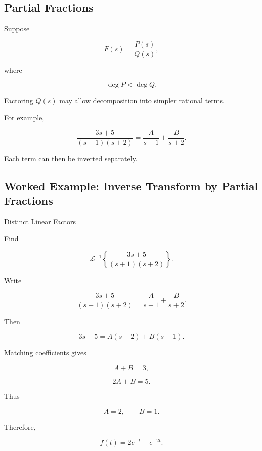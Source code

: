 \subsection{Partial Fractions}
\label{subsec:laplace-partial-fractions}

Suppose

\[
F(s)
=
\frac{
P(s)
}{
Q(s)
},
\]

where

\[
\deg P<\deg Q.
\]

Factoring \(Q(s)\) may allow decomposition into simpler rational terms.

For example,

\[
\boxed{
\frac{
3s+5
}{
(s+1)(s+2)
}
=
\frac{A}{s+1}
+
\frac{B}{s+2}.
}
\]

Each term can then be inverted separately.

\subsection{Worked Example: Inverse Transform by Partial Fractions}
\label{subsec:worked-inverse-partial-fractions}

\begin{workedexamplebox}{Distinct Linear Factors}

Find

\[
\mathcal{L}^{-1}
\left\{
\frac{
3s+5
}{
(s+1)(s+2)
}
\right\}.
\]

Write

\[
\frac{
3s+5
}{
(s+1)(s+2)
}
=
\frac{A}{s+1}
+
\frac{B}{s+2}.
\]

Then

\[
3s+5
=
A(s+2)
+
B(s+1).
\]

Matching coefficients gives

\[
A+B=3,
\]

\[
2A+B=5.
\]

Thus

\[
A=2,
\qquad
B=1.
\]

Therefore,

\begin{answerbox}
\[
\boxed{
f(t)
=
2e^{-t}
+
e^{-2t}.
}
\]
\end{answerbox}

\end{workedexamplebox}

